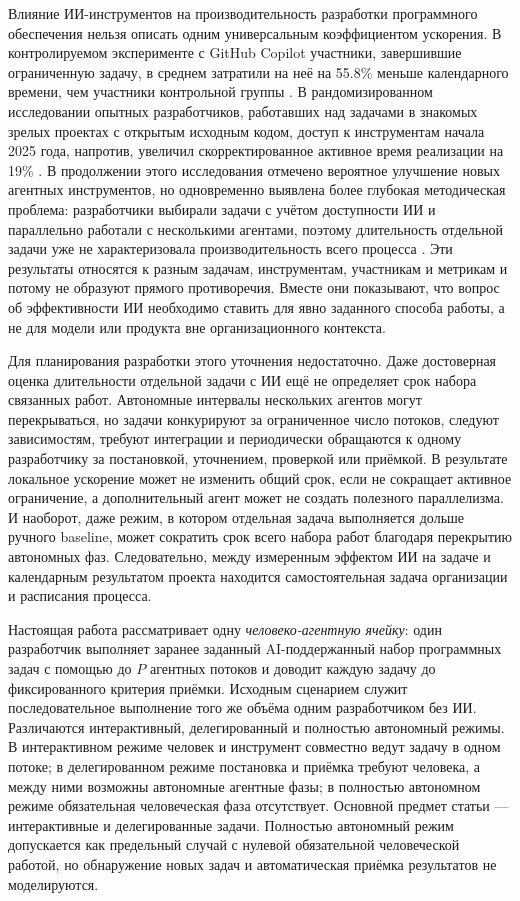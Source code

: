 Влияние ИИ-инструментов на производительность разработки программного
обеспечения нельзя описать одним универсальным коэффициентом ускорения. В
контролируемом эксперименте с GitHub Copilot участники, завершившие ограниченную
задачу, в среднем затратили на неё на 55.8\% меньше календарного времени, чем
участники контрольной группы \cite{peng2023impact}. В рандомизированном
исследовании опытных разработчиков, работавших над задачами в знакомых зрелых
проектах с открытым исходным кодом, доступ к инструментам начала 2025 года,
напротив, увеличил скорректированное активное время реализации на 19\%
\cite{becker2025measuring}. В продолжении этого исследования отмечено вероятное
улучшение новых агентных инструментов, но одновременно выявлена более глубокая
методическая проблема: разработчики выбирали задачи с учётом доступности ИИ и
параллельно работали с несколькими агентами, поэтому длительность отдельной
задачи уже не характеризовала производительность всего процесса
\cite{metr2026uplift}. Эти результаты относятся к разным задачам, инструментам,
участникам и метрикам и потому не образуют прямого противоречия. Вместе они
показывают, что вопрос об эффективности ИИ необходимо ставить для явно заданного
способа работы, а не для модели или продукта вне организационного контекста.

Для планирования разработки этого уточнения недостаточно. Даже достоверная
оценка длительности отдельной задачи с ИИ ещё не определяет срок набора
связанных работ. Автономные интервалы нескольких агентов могут перекрываться,
но задачи конкурируют за ограниченное число потоков, следуют зависимостям,
требуют интеграции и периодически обращаются к одному разработчику за
постановкой, уточнением, проверкой или приёмкой. В результате локальное
ускорение может не изменить общий срок, если не сокращает активное ограничение,
а дополнительный агент может не создать полезного параллелизма. И наоборот,
даже режим, в котором отдельная задача выполняется дольше ручного baseline,
может сократить срок всего набора работ благодаря перекрытию автономных фаз.
Следовательно, между измеренным эффектом ИИ на задаче и календарным результатом
проекта находится самостоятельная задача организации и расписания процесса.

Настоящая работа рассматривает одну \emph{человеко-агентную ячейку}: один
разработчик выполняет заранее заданный AI-поддержанный набор программных задач
с помощью до $P$ агентных потоков и доводит каждую задачу до фиксированного
критерия приёмки. Исходным сценарием служит последовательное выполнение того же
объёма одним разработчиком без ИИ. Различаются интерактивный, делегированный и
полностью автономный режимы. В интерактивном режиме человек и инструмент
совместно ведут задачу в одном потоке; в делегированном режиме постановка и
приёмка требуют человека, а между ними возможны автономные агентные фазы; в
полностью автономном режиме обязательная человеческая фаза отсутствует.
Основной предмет статьи --- интерактивные и делегированные задачи. Полностью
автономный режим допускается как предельный случай с нулевой обязательной
человеческой работой, но обнаружение новых задач и автоматическая приёмка
результатов не моделируются.


